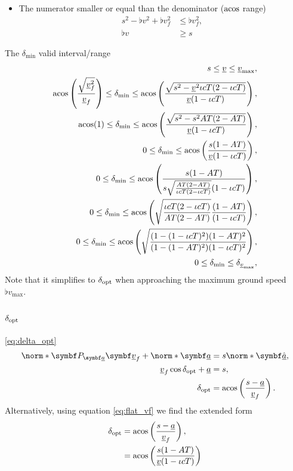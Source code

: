 \begin{itemize}
\item
The numerator smaller or equal than the denominator ($\operatorname{acos}$ range)
\begin{align*}
s^2 - \flat{v}^2 + \flat{v}_f^2 &\le \flat{v}_f^2,\\
\flat{v} &\ge s
\end{align*}
\end{itemize}


The $\delta_{\min}$ valid interval/range
\begin{align*}
s \le \flat{v} \le \flat{v}_{\max},\\
\acos\left(\frac{\sqrt{\flat{v}_f^2}}{\flat{v}_f} \right) \le \delta_{\min} \le \acos\left(\frac{\sqrt{s^2 - \flat{v}^2\iota cT(2 - \iota cT)}}{\flat{v}(1 - \iota cT)}\right),\\
\acos(1) \le \delta_{\min} \le \acos\left(\frac{\sqrt{s^2 - s^2 AT(2 - AT)}}{\flat{v}(1 - \iota cT)}\right),\\
0 \le \delta_{\min} \le \acos\left(\frac{s(1 - AT)}{\flat{v}(1 - \iota cT)}\right),\\
0 \le \delta_{\min} \le \acos\left(\frac{s(1 - AT)}{s\sqrt{\frac{AT(2 - AT)}{\iota cT(2 - \iota cT)}} (1 - \iota cT)}\right),\\
0 \le \delta_{\min} \le \acos\left(\sqrt{\frac{\iota cT(2 - \iota cT)}{AT(2 - AT)}} \frac{(1 - AT)}{(1 - \iota cT)}\right),\\
0 \le \delta_{\min} \le \acos\left(\sqrt{\frac{(1 - (1 - \iota cT)^2) (1 - AT)^2}{(1 - (1 - AT)^2) (1 - \iota cT)^2}}\right),\\
0 \le \delta_{\min} \le \delta_{\flat{v}_{\max}},\\
\end{align*}
Note that it simplifies to $\delta_{\operatorname{opt}}$ when approaching the maximum ground speed $\flat{v}_{\max}$.


\subsection{\texorpdfstring{$\delta_{\operatorname{opt}}$}{delta\_opt}}
\eqref{eq:delta_opt}
\begin{align*}
\norm*{\projmat{\flat{a}} \vec{\flat{v}}_f} + \norm*{\vec{\flat{a}}} &= s \norm*{\uvec{\flat{a}}},\\
\flat{v}_f \cos\delta_{\opt} + \flat{a} &= s,\\
\delta_{\opt} &= \acos\left( \frac{s - \flat{a}}{\flat{v}_f} \right).
\end{align*}
Alternatively, using equation \eqref{eq:flat_vf} we find the extended form
\begin{align*}
\delta_{\opt} &= \acos\left( \frac{s - \flat{a}}{\flat{v}_f} \right),\\
&= \acos\left( \frac{s(1 - AT)}{\flat{v}(1 - \iota cT)} \right)
\end{align*}

